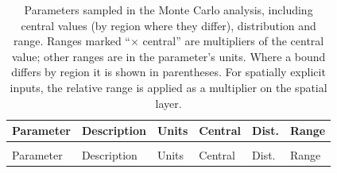 \documentclass[
  letterpaper,
]{article}
\begin{document}
\begin{longtable}[t]{>{\raggedright\arraybackslash}p{3.3cm}>{\raggedright\arraybackslash}p{4.1cm}>{\raggedright\arraybackslash}p{2.1cm}>{\raggedright\arraybackslash}p{2.2cm}>{\raggedright\arraybackslash}p{0.9cm}>{\raggedright\arraybackslash}p{2.6cm}}

\caption{\label{tbl-si-mc}Parameters sampled in the Monte Carlo
analysis, including central values (by region where they differ),
distribution and range. Ranges marked ``× central'' are multipliers of
the central value; other ranges are in the parameter's units. Where a
bound differs by region it is shown in parentheses. For spatially
explicit inputs, the relative range is applied as a multiplier on the
spatial layer.}

\tabularnewline

\toprule
Parameter & Description & Units & Central & Dist. & Range\\
\midrule
\endfirsthead
\multicolumn{6}{@{}l}{\textit{(continued)}}\\
\toprule
Parameter & Description & Units & Central & Dist. & Range\\
\midrule
\endhead


\end{longtable}
\end{document}
